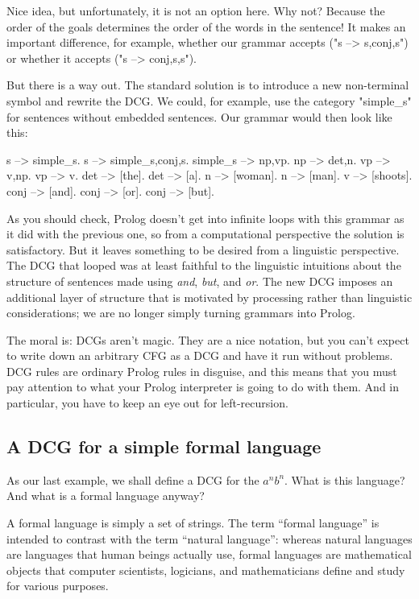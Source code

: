 Nice idea, but unfortunately, it is not an option here.  Why not?
Because the order of the goals determines the order of the words in
the sentence!  It makes an important difference, for example, whether
our grammar accepts  ("s --> s,conj,s") or whether it accepts
 ("s --> conj,s,s").

But there is a way out.
The standard solution is to introduce a new non-terminal symbol and
rewrite the DCG.  We could, for example, use the category "simple_s"
for sentences without embedded sentences. Our grammar would then look
like this:
\begin{LPNcodedisplay}
s --> simple_s.
s --> simple_s,conj,s.
simple_s --> np,vp.
np --> det,n.
vp --> v,np.
vp --> v.
det --> [the].
det --> [a].
n --> [woman].
n --> [man].
v --> [shoots].
conj --> [and].
conj --> [or].
conj --> [but].
\end{LPNcodedisplay}
As you should check, Prolog doesn't get into infinite loops with this
grammar as it did with the previous one, so from a computational
perspective the solution is satisfactory. But it leaves something to
be desired from a linguistic perspective. The DCG that looped was at
least faithful to the linguistic intuitions about the structure of
sentences made using \textit{and}, \textit{but}, and \textit{or}.  The
new DCG imposes an additional layer of structure that is motivated by
processing rather than linguistic considerations; we are no longer
simply turning grammars into Prolog.

The moral is: DCGs aren't magic. They are a nice notation, but you
can't expect to write down an arbitrary CFG as a DCG and have it run
without problems. DCG rules are ordinary Prolog rules in disguise, and
this means that you must pay attention to what your Prolog interpreter
is going to do with them. And in particular, you have to keep an eye
out for left-recursion.


\subsection*{A DCG for a simple formal language}\label{SUBSEC.L7.ANBN}

As our last example, we shall define a DCG for the  $a^nb^n$. What is this language? And what is a formal
language anyway?

 A formal language is simply a set of strings. The term ``formal
language'' is intended to contrast with the term ``natural language'':
whereas natural languages are languages that human beings actually
use, formal languages are mathematical objects that computer
scientists, logicians, and mathematicians define and study for various
purposes.


